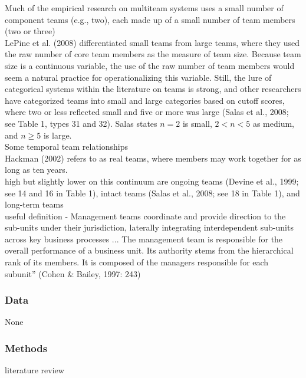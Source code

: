 \documentclass[12pt]{article}
\begin{document}
Much of the empirical research on multiteam systems uses a small number of component teams (e.g., two), each made up of a small number of team members (two or three)\\

LePine et al. (2008) differentiated small teams from large teams, where they used the raw number of core team members as the measure of team size.\cite{meta_teamwork_processes} Because team size is a continuous variable, the use of the raw number of team members would seem a natural practice for operationalizing this variable. Still, the lure of categorical systems within the literature on teams is strong, and other researchers have categorized teams into small and large categories based on cutoff scores, where two or less reflected small and five or more was large (Salas et al., 2008; see Table 1, types 31 and 32). Salas states $n=2$ is small, $2 < n< 5$ as medium, and $n\geq 5$ is large.\cite{team_training}\\

Some temporal team relationships\\

Hackman (2002) refers to as real teams, where members may work together for as long as ten years. \\

high but slightly lower on this continuum are ongoing teams (Devine et al., 1999; see 14 and 16 in Table 1), intact teams (Salas et al., 2008; see 18 in Table 1), and long-term teams \\

useful definition - Management teams coordinate and provide direction to the sub-units under their jurisdiction, laterally integrating interdependent sub-units across key business processes ... The management team is responsible for the overall performance of a business unit. Its authority stems from the hierarchical rank of its members. It is composed of the managers responsible for each subunit” (Cohen \& Bailey, 1997: 243)


\subsubsection*{Data}

None

\subsubsection*{Methods}

literature review
\end{document}
